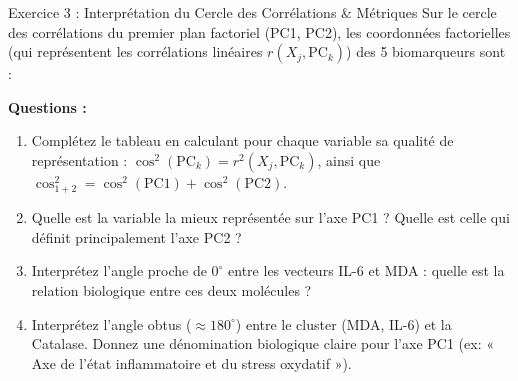 \documentclass[11pt,a4paper]{article}
\begin{document}
\begin{exercicebox}{Exercice 3 : Interprétation du Cercle des Corrélations \& Métriques}
Sur le cercle des corrélations du premier plan factoriel (PC1, PC2), les coordonnées factorielles (qui représentent les corrélations linéaires $r(X_j, \text{PC}_k)$) des 5 biomarqueurs sont :
\begin{center}
\end{center}

\textbf{Questions :}
\begin{enumerate}[label=\textbf{\alph*.}]
  \item Complétez le tableau en calculant pour chaque variable sa qualité de représentation : $\cos^2(\text{PC}_k) = r^2(X_j, \text{PC}_k)$, ainsi que $\cos^2_{1+2} = \cos^2(\text{PC1}) + \cos^2(\text{PC2})$.
  \item Quelle est la variable la mieux représentée sur l'axe PC1 ? Quelle est celle qui définit principalement l'axe PC2 ?
  \item Interprétez l'angle proche de $0^\circ$ entre les vecteurs IL-6 et MDA : quelle est la relation biologique entre ces deux molécules ?
  \item Interprétez l'angle obtus ($\approx 180^\circ$) entre le cluster (MDA, IL-6) et la Catalase. Donnez une dénomination biologique claire pour l'axe PC1 (ex: « Axe de l'état inflammatoire et du stress oxydatif »).
\end{enumerate}
\end{exercicebox}
\end{document}
